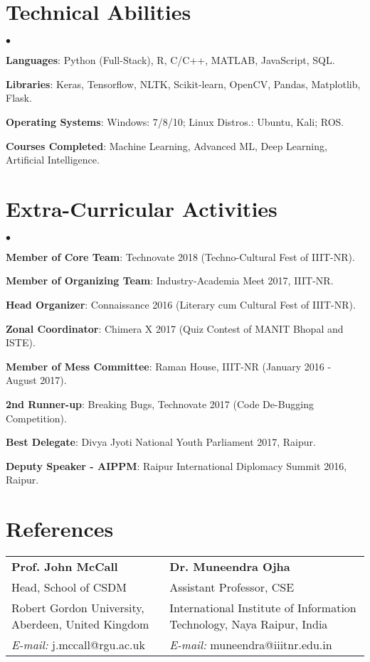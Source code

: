 \documentclass[margin,line]{res}
\newenvironment{list2}{
  \begin{list}{$\bullet$}{%
      \setlength{\itemsep}{0in}
      \setlength{\parsep}{0in} \setlength{\parskip}{0in}
      \setlength{\topsep}{0in} \setlength{\partopsep}{0in} 
      \setlength{\leftmargin}{0.2in}}}{\end{list}}
\begin{document}
\begin{resume}
\section{\sc Technical Abilities}
\begin{list2}
\item {\bf Languages}:  Python (Full-Stack), R, C/C++, MATLAB, JavaScript, SQL.
\item {\bf Libraries}: Keras, Tensorflow, NLTK, Scikit-learn, OpenCV, Pandas, Matplotlib, Flask.
\item {\bf Operating Systems}:  Windows: 7/8/10; Linux Distros.: Ubuntu, Kali; ROS.
\item {\bf Courses Completed}: Machine Learning, Advanced ML, Deep Learning, Artificial Intelligence.
\end{list2}


\vspace{-0.1cm}
\section{\sc Extra-Curricular Activities}
\begin{list2}
\item {\bf Member of Core Team}: Technovate 2018 (Techno-Cultural Fest of IIIT-NR).
\item {\bf Member of Organizing Team}: Industry-Academia Meet 2017, IIIT-NR.
\item {\bf Head Organizer}: Connaissance 2016 (Literary cum Cultural Fest of IIIT-NR).
\item {\bf Zonal Coordinator}: Chimera X 2017 (Quiz Contest of MANIT Bhopal and ISTE).
\item {\bf Member of Mess Committee}: Raman House, IIIT-NR (January 2016 - August 2017).
\item {\bf 2nd Runner-up}: Breaking Bugs, Technovate 2017 (Code De-Bugging Competition).
\item {\bf Best Delegate}: Divya Jyoti National Youth Parliament 2017, Raipur.
\item {\bf Deputy Speaker - AIPPM}: Raipur International Diplomacy Summit 2016, Raipur.
\end{list2}

\section{\sc References}
\vspace{.01in}
\begin{tabular}{@{}p{2.5in}p{3in}}
{\bf Prof. John McCall} & {\it} {\bf Dr. Muneendra Ojha} \\ 
Head, School of CSDM & {\it} Assistant Professor, CSE \\
Robert Gordon University, Aberdeen, United Kingdom & {\it} International Institute of Information Technology, Naya Raipur, India\\
{\it E-mail:} j.mccall@rgu.ac.uk & {\it E-mail:} muneendra@iiitnr.edu.in \\
\end{tabular}


\end{resume}
\end{document}
